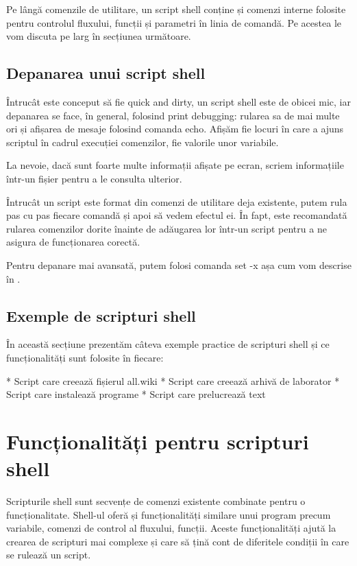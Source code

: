 Pe lângă comenzile de utilitare, un script shell conține și comenzi interne
folosite pentru controlul fluxului, funcții și parametri în linia de comandă. Pe
acestea le vom discuta pe larg în secțiunea următoare.

\subsection{Depanarea unui script shell}
\label{sec:auto-dev-debugging}

Întrucât este conceput să fie quick and dirty, un script shell este de obicei
mic, iar depanarea se face, în general, folosind print debugging: rularea sa de
mai multe ori și afișarea de mesaje folosind comanda echo. Afișăm fie locuri în
care a ajuns scriptul în cadrul execuției comenzilor, fie valorile unor
variabile.

La nevoie, dacă sunt foarte multe informații afișate pe ecran, scriem
informațiile într-un fișier pentru a le consulta ulterior.

Întrucât un script este format din comenzi de utilitare deja existente, putem
rula pas cu pas fiecare comandă și apoi să vedem efectul ei. În fapt, este
recomandată rularea comenzilor dorite înainte de adăugarea lor într-un script
pentru a ne asigura de funcționarea corectă.

Pentru depanare mai avansată, putem folosi comanda set -x așa cum vom descrise
în .

\subsection{Exemple de scripturi shell}
\label{sec:auto-dev-ex}

În această secțiune prezentăm câteva exemple practice de scripturi shell și ce
funcționalități sunt folosite în fiecare:

* Script care creează fișierul all.wiki
* Script care creează arhivă de laborator
* Script care instalează programe
* Script care prelucrează text

\section{Funcționalități pentru scripturi shell}
\label{sec:auto-func}

Scripturile shell sunt secvențe de comenzi existente combinate pentru o
funcționalitate. Shell-ul oferă și funcționalități similare unui program precum
variabile, comenzi de control al fluxului, funcții. Aceste funcționalități ajută
la crearea de scripturi mai complexe și care să țină cont de diferitele condiții
în care se rulează un script.

